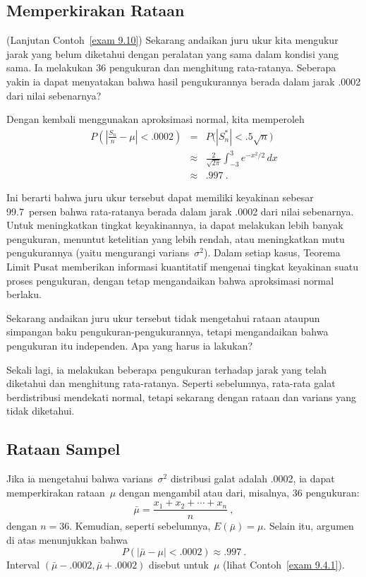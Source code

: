 \subsection*{Memperkirakan Rataan}

\begin{example}(Lanjutan Contoh~\ref{exam 9.10})
Sekarang andaikan juru ukur kita mengukur jarak yang belum diketahui dengan peralatan yang sama
dalam kondisi yang sama.  Ia melakukan 36 pengukuran dan menghitung rata-ratanya.  Seberapa yakin
ia dapat menyatakan bahwa hasil pengukurannya berada dalam jarak .0002 dari nilai sebenarnya?

Dengan kembali menggunakan aproksimasi normal, kita memperoleh
\begin{eqnarray*}
P\left(\left|\frac {S_n}n - \mu\right| < .0002 \right) &=& P\bigl(|S_n^*| < .5\sqrt n\bigr) \\
     &\approx& \frac 2{\sqrt{2\pi}} \int_{-3}^3 e^{-x^2/2}\, dx \\
     &\approx& .997\ .
\end{eqnarray*}


Ini berarti bahwa juru ukur tersebut dapat memiliki keyakinan sebesar 99.7~persen bahwa rata-ratanya berada
dalam jarak .0002 dari nilai sebenarnya.  Untuk meningkatkan tingkat keyakinannya, ia dapat
melakukan lebih banyak pengukuran, menuntut ketelitian yang lebih rendah, atau meningkatkan mutu
pengukurannya (yaitu mengurangi varians~$\sigma^2$).  Dalam setiap kasus, Teorema Limit Pusat
memberikan informasi kuantitatif mengenai tingkat keyakinan suatu proses pengukuran, dengan tetap
mengandaikan bahwa aproksimasi normal berlaku.
\par
Sekarang andaikan juru ukur tersebut tidak mengetahui rataan ataupun simpangan baku
pengukuran-pengukurannya, tetapi mengandaikan bahwa pengukuran itu independen.  Apa yang harus ia
lakukan?
\par
Sekali lagi, ia melakukan beberapa pengukuran terhadap jarak yang telah diketahui dan menghitung
rata-ratanya.  Seperti sebelumnya, rata-rata galat berdistribusi mendekati normal, tetapi sekarang
dengan rataan dan varians yang tidak diketahui.
\end{example}
\subsection*{Rataan Sampel}
Jika ia mengetahui bahwa varians~$\sigma^2$ distribusi galat adalah .0002, ia dapat memperkirakan
rataan~$\mu$ dengan mengambil  atau  dari, misalnya, 36
pengukuran:
$$
\bar \mu = \frac {x_1 + x_2 +\cdots+ x_n}n\ ,
$$
dengan $n = 36$.  Kemudian, seperti sebelumnya, $E(\bar \mu) = \mu$.  Selain itu, argumen di atas
menunjukkan bahwa
$$
P(|\bar \mu - \mu| < .0002) \approx .997\ .
$$
Interval $(\bar \mu - .0002, \bar \mu + .0002)$ disebut  untuk~$\mu$ (lihat Contoh~\ref{exam 9.4.1}).

